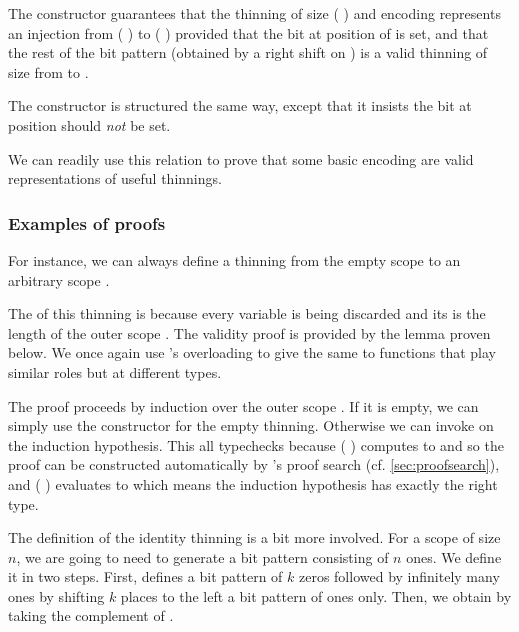 The  constructor guarantees that the thinning of
size ( ) and encoding 
represents an injection
from ( \IdrisData{:<} )
to ( \IdrisData{:<} )
provided that the bit at position  of 
is set, and that the rest of the bit pattern (obtained by a right shift
on ) is a valid thinning of size  from
 to .

The  constructor is structured the same way, except that
it insists the bit at position  should \emph{not} be set.

We can readily use this relation to prove that some basic encoding are
valid representations of useful thinnings.

\subsubsection{Examples of  proofs}

For instance, we can always define a thinning from the empty scope to
an arbitrary scope .


The  of this thinning is  because
every variable is being discarded and its  is
the length of the outer scope .
%
The validity proof is provided by
the  lemma proven below.
%
We once again use \idris{}'s overloading
to give the same to functions that play similar roles but at
different types.


The proof proceeds by induction over the outer scope . If it
is empty, we can simply use the constructor for the empty thinning.
%
Otherwise we can invoke  on the induction hypothesis.
%
This all typechecks because (  )
computes to  and so the  proof can be constructed
automatically by \idris{}'s proof search (cf. \cref{sec:proofsearch}),
%
and (  ) evaluates to 
which means the induction hypothesis has exactly the right type.


The definition of the identity thinning is a bit more involved.
%
For a scope of size $n$, we are going to need to generate a bit pattern
consisting of $n$ ones.
%
We define it in two steps.
%
First,  defines a bit pattern of $k$ zeros followed by
infinitely many ones by shifting $k$ places to the left a bit pattern of ones only.
%
Then, we obtain  by taking the complement of .

